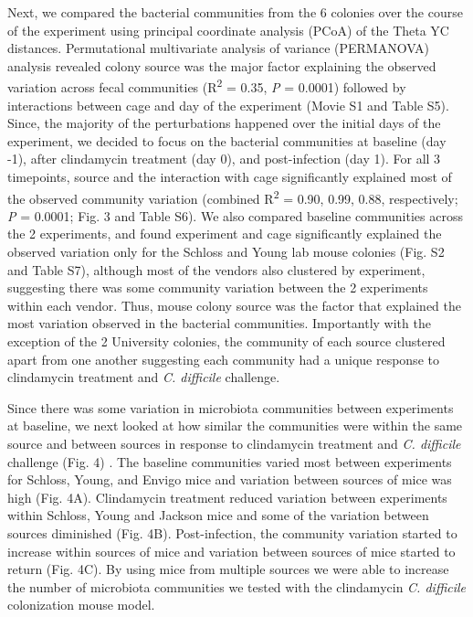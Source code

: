 \documentclass[11pt,]{article}
\begin{document}
Next, we compared the bacterial communities from the 6 colonies over the
course of the experiment using principal coordinate analysis (PCoA) of
the Theta YC distances. Permutational multivariate analysis of variance
(PERMANOVA) analysis revealed colony source was the major factor
explaining the observed variation across fecal communities
(R\textsuperscript{2} = 0.35, \emph{P} = 0.0001) followed by
interactions between cage and day of the experiment (Movie S1 and Table
S5). Since, the majority of the perturbations happened over the initial
days of the experiment, we decided to focus on the bacterial communities
at baseline (day -1), after clindamycin treatment (day 0), and
post-infection (day 1). For all 3 timepoints, source and the interaction
with cage significantly explained most of the observed community
variation (combined R\textsuperscript{2} = 0.90, 0.99, 0.88,
respectively; \emph{P} = 0.0001; Fig. 3 and Table S6). We also compared
baseline communities across the 2 experiments, and found experiment and
cage significantly explained the observed variation only for the Schloss
and Young lab mouse colonies (Fig. S2 and Table S7), although most of
the vendors also clustered by experiment, suggesting there was some
community variation between the 2 experiments within each vendor. Thus,
mouse colony source was the factor that explained the most variation
observed in the bacterial communities. Importantly with the exception of
the 2 University colonies, the community of each source clustered apart
from one another suggesting each community had a unique response to
clindamycin treatment and \emph{C. difficile} challenge.

Since there was some variation in microbiota communities between
experiments at baseline, we next looked at how similar the communities
were within the same source and between sources in response to
clindamycin treatment and \emph{C. difficile} challenge (Fig. 4) . The
baseline communities varied most between experiments for Schloss, Young,
and Envigo mice and variation between sources of mice was high (Fig.
4A). Clindamycin treatment reduced variation between experiments within
Schloss, Young and Jackson mice and some of the variation between
sources diminished (Fig. 4B). Post-infection, the community variation
started to increase within sources of mice and variation between sources
of mice started to return (Fig. 4C). By using mice from multiple sources
we were able to increase the number of microbiota communities we tested
with the clindamycin \emph{C. difficile} colonization mouse model.
\end{document}
